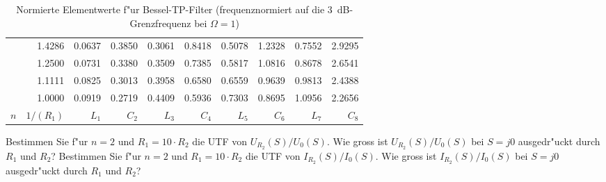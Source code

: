 \begin{table}[!htb]
\begin{center}
{\begin{tabular}{|c||r|r|r|r|r|r|r|r|r|}
&1.4286&0.0637&0.3850&0.3061&0.8418&0.5078&1.2328&0.7552&2.9295\\
&1.2500&0.0731&0.3380&0.3509&0.7385&0.5817&1.0816&0.8678&2.6541\\
&1.1111&0.0825&0.3013&0.3958&0.6580&0.6559&0.9639&0.9813&2.4388\\
&1.0000&0.0919&0.2719&0.4409&0.5936&0.7303&0.8695&1.0956&2.2656\\ \hline\hline
$n$ & $1/(R_1)$ & $L_1$ & $C_2$ & $L_3$ & $C_4$ & $L_5$ & $C_6$ & $L_7$ & $C_8$\\ \hline
\end{tabular}\vspace*{-1mm}\caption{Normierte Elementwerte f"ur Bessel-TP-Filter (frequenznormiert
auf die 3~dB-Grenzfrequenz bei $\Omega=1$)}}
\end{center}\vspace*{-1cm}
\end{table}%
\aufg
Bestimmen Sie f"ur $n=2$ und $R_1=10\cdot R_2$ die UTF von $U_{R_2}(S)/U_0(S)$. Wie gross ist $U_{R_2}(S)/U_0(S)$ bei $S=j0$ ausgedr"uckt durch $R_1$ und $R_2$? Bestimmen Sie f"ur $n=2$ und $R_1=10\cdot R_2$ die UTF von $I_{R_2}(S)/I_0(S)$. Wie gross ist $I_{R_2}(S)/I_0(S)$ bei $S=j0$ ausgedr"uckt durch $R_1$ und $R_2$?

\clearpage




